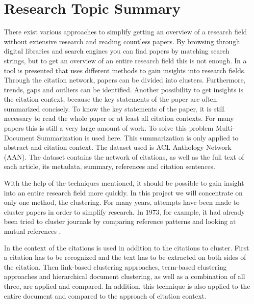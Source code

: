 \section{Research Topic Summary}
There exist various approaches to simplify getting an overview of a research field without extensive research and reading countless papers. By browsing through digital libraries and search engines you can find papers by matching search strings, but to get an overview of an entire research field this is not enough.
In \cite{Rapid_understanding_of_scientific_paper_collections} a tool is presented that uses different methods to gain insights into research fields.
Through the citation network, papers can be divided into clusters. Furthermore, trends, gaps and outliers can be identified.
Another possibility to get insights is the citation context, because the key statements of the paper are often summarized concisely.  To know the key statements of the paper, it is still necessary to read the whole paper or at least all citation contexts. For many papers this is still a very large amount of work. To solve this problem Multi-Document Summarization is used here. This summarization is only applied to abstract and citation context. The dataset used is ACL Anthology Network (AAN).\cite{aan} The dataset contains the network of citations, as well as the full text of each article, its metadata, summary, references and citation sentences. 

With the help of the techniques mentioned, it should be possible to gain insight into an entire research field more quickly.
In this project we will concentrate on only one method, the clustering.
For many years, attempts have been made to cluster papers in order to simplify research. In 1973, for example, it had already been tried to cluster journals by comparing reference patterns and looking at mutual references \cite{Clustering_of_scientific_journals}.

In \cite{Document_clustering_of_scientific_texts_using_citation_contexts} the context of the citations is used in addition to the citations to cluster.
First a citation has to be recognized and the text has to be extracted on both sides of the citation. Then link-based clustering approaches, term-based clustering approaches and hierarchical document clustering, as well as a combination of all three, are applied and compared. In addition, this technique is also applied to the entire document and compared to the approach of citation context.

